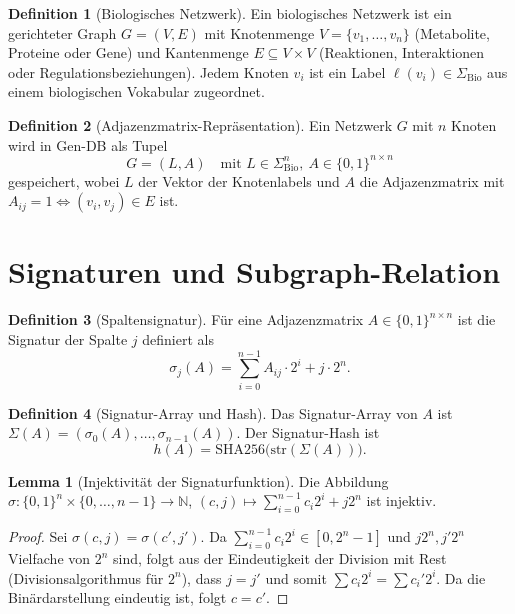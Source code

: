 \documentclass[a4paper,12pt, twoside]{report}
\theoremstyle{definition}
\newtheorem{definition}{Definition}
\newtheorem{lemma}{Lemma}
\begin{document}
\begin{definition}[Biologisches Netzwerk]
	Ein biologisches Netzwerk ist ein gerichteter Graph $G = (V, E)$ mit Knotenmenge $V = \{v_1, \ldots, v_n\}$ (Metabolite, Proteine oder Gene) und Kantenmenge $E \subseteq V \times V$ (Reaktionen, Interaktionen oder Regulationsbeziehungen). Jedem Knoten $v_i$ ist ein Label $\ell(v_i) \in \Sigma_{\text{Bio}}$ aus einem biologischen Vokabular zugeordnet.
\end{definition}

\begin{definition}[Adjazenzmatrix-Repräsentation]
	Ein Netzwerk $G$ mit $n$ Knoten wird in Gen-DB als Tupel
	\[
	G = (L, A) \quad \text{mit } L \in \Sigma_{\text{Bio}}^n,\ A \in \{0,1\}^{n \times n}
	\]
	gespeichert, wobei $L$ der Vektor der Knotenlabels und $A$ die Adjazenzmatrix mit $A_{ij} = 1 \Leftrightarrow (v_i, v_j) \in E$ ist.
\end{definition}

\section{Signaturen und Subgraph-Relation}

\begin{definition}[Spaltensignatur]
	Für eine Adjazenzmatrix $A \in \{0,1\}^{n \times n}$ ist die Signatur der Spalte $j$ definiert als
	\[
	\sigma_j(A) = \sum_{i=0}^{n-1} A_{ij} \cdot 2^i + j \cdot 2^n.
	\]
\end{definition}

\begin{definition}[Signatur-Array und Hash]
	Das Signatur-Array von $A$ ist $\Sigma(A) = (\sigma_0(A), \ldots, \sigma_{n-1}(A))$. Der Signatur-Hash ist
	\[
	h(A) = \mathrm{SHA256}\bigl(\mathrm{str}(\Sigma(A))\bigr).
	\]
\end{definition}

\begin{lemma}[Injektivität der Signaturfunktion]
	\label{lem:injektiv}
	Die Abbildung $\sigma: \{0,1\}^n \times \{0,\ldots,n-1\} \to \mathbb{N}$, $(c, j) \mapsto \sum_{i=0}^{n-1} c_i 2^i + j2^n$ ist injektiv.
\end{lemma}

\begin{proof}
	Sei $\sigma(c,j) = \sigma(c',j')$. Da $\sum_{i=0}^{n-1} c_i 2^i \in [0, 2^n-1]$ und $j2^n, j'2^n$ Vielfache von $2^n$ sind, folgt aus der Eindeutigkeit der Division mit Rest (Divisionsalgorithmus für $2^n$), dass $j = j'$ und somit $\sum c_i 2^i = \sum c_i' 2^i$. Da die Binärdarstellung eindeutig ist, folgt $c = c'$.
\end{proof}
\end{document}
